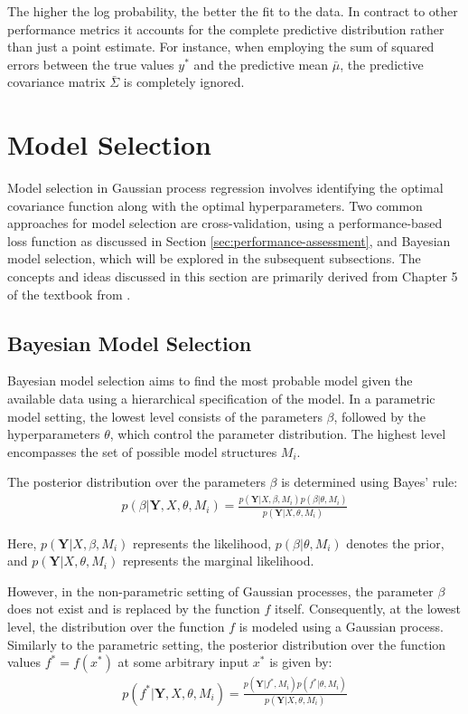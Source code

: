 The higher the log probability, the better the fit to the data.
In contract to other performance metrics it accounts for the complete predictive
distribution rather than just a point estimate.
For instance, when employing the sum of squared errors between the true values $y^{\ast}$ and the predictive mean
$\bar{\mu}$, the predictive covariance matrix $\bar{\Sigma}$ is completely ignored.

\section{Model Selection}

Model selection in Gaussian process regression involves identifying the optimal covariance function
along with the optimal hyperparameters.
Two common approaches for model selection are cross-validation, using a performance-based loss
function as discussed in Section \ref{sec:performance-assessment}, and Bayesian model selection,
which will be explored in the subsequent subsections.
The concepts and ideas discussed in this section are primarily derived from Chapter 5 of
the textbook from \citeauthor{rasmussen_gaussian_2006}.

\subsection{Bayesian Model Selection}

Bayesian model selection aims to find the most probable model given the available data
using a hierarchical specification of the model.
In a parametric model setting, the lowest level consists of the parameters $\beta$,
followed by the hyperparameters $\theta$, which control the parameter distribution.
The highest level encompasses the set of possible model structures $M_i$.

The posterior distribution over the parameters $\beta$ is determined using Bayes' rule:
\begin{gather*}
    p(\beta | \mathbf{Y}, X, \theta, M_i) = \frac{p( \mathbf{Y}| X, \beta,
        M_i)p(\beta|\theta, M_i)}{p(\mathbf{Y}|X, \theta, M_i)}
\end{gather*}

Here, $p(\mathbf{Y} | X, \beta, M_i)$ represents the likelihood, $p(\beta | \theta, M_i)$ denotes the prior,
and $p(\mathbf{Y} | X, \theta, M_i)$ represents the marginal likelihood.


However, in the non-parametric setting of Gaussian processes, the parameter $\beta$ does not exist and is
replaced by the function $f$ itself.
Consequently, at the lowest level, the distribution over the function $f$ is modeled using a Gaussian process.
Similarly to the parametric setting, the posterior distribution over the function values
$f^{\ast} = f(x^{\ast})$ at some arbitrary input $x^{\ast}$ is given by:
\begin{gather*}
    p(f^{\ast} | \mathbf{Y}, X, \theta, M_i) = \frac{p( \mathbf{Y}| f^{\ast}, M_i)p(f^{\ast} | \theta, M_i)}{p(\mathbf{Y}|X, \theta, M_i)}
\end{gather*}

